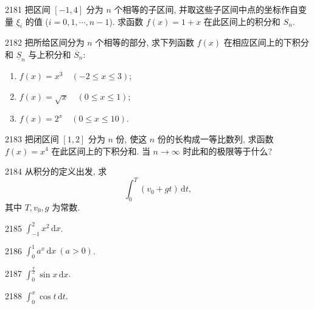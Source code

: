 

\begin{prob}[M]{2181}
把区间 $[-1, 4]$ 分为 $n$ 个相等的子区间, 并取这些子区间中点的坐标作自变量 $\xi_i$ 的值 ($i = 0, 1, \cdots, n-1$). 求函数 $f(x) = 1 + x$ 在此区间上的积分和 $S_n$.
\end{prob}

\begin{prob}[L]{2182}
把所给区间分为 $n$ 个相等的部分, 求下列函数 $f(x)$ 在相应区间上的下积分和 $\underline{S}_n$ 与上积分和 $\overline{S}_n$:
\begin{enumerate}[label=(\alph*), itemsep=2pt, topsep=3pt]
  \item $f(x) = x^3 \quad (-2 \leqslant x \leqslant 3)$;
  \item $f(x) = \sqrt{x} \quad (0 \leqslant x \leqslant 1)$;
  \item $f(x) = 2^x \quad (0 \leqslant x \leqslant 10)$.
\end{enumerate}
\end{prob}

\begin{prob}[M]{2183}
把闭区间 $[1, 2]$ 分为 $n$ 份, 使这 $n$ 份的长构成一等比数列, 求函数 $f(x) = x^4$ 在此区间上的下积分和. 当 $n \to \infty$ 时此和的极限等于什么?
\end{prob}

\begin{prob}[M]{2184}
从积分的定义出发, 求
\[
\int_{0}^{T} (v_0 + gt)\,\mathrm{d}t,
\]
其中 $T, v_0, g$ 为常数.
\end{prob}


\begin{prob}[S]{2185}
$\displaystyle\int_{-1}^{2} x^2\,\mathrm{d}x$.
\end{prob}

\begin{prob}[S]{2186}
$\displaystyle\int_{0}^{1} a^x\,\mathrm{d}x \ (a > 0)$.
\end{prob}

\begin{prob}[S]{2187}
$\displaystyle\int_{0}^{\frac{\pi}{2}} \sin x\,\mathrm{d}x$.
\end{prob}

\begin{prob}[S]{2188}
$\displaystyle\int_{0}^{x} \cos t\,\mathrm{d}t$.
\end{prob}

